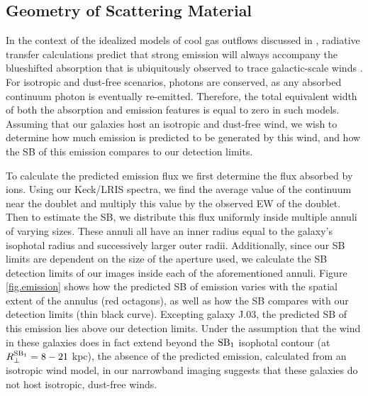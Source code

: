 \documentclass[twocolumn]{aastex62}
\begin{document}
\subsection{Geometry of Scattering Material}
In the context of the idealized models of cool gas outflows discussed in \cite{Prochaska_2011}, radiative transfer calculations predict that strong  emission will always accompany the blueshifted  absorption that is ubiquitously observed to trace galactic-scale winds \citep{Weiner2009,Martin2012,Rubin_2014}. For isotropic and dust-free scenarios, photons are conserved, as any absorbed continuum photon is eventually re-emitted.  Therefore, the total equivalent width of both the absorption and emission features is equal to zero in such models. Assuming that our galaxies host an isotropic and dust-free wind, we wish to determine how much emission is predicted to be generated by this wind, and how the SB of this emission compares to our detection limits.

To calculate the predicted emission flux we first determine the flux absorbed by  ions. Using our Keck/LRIS spectra, we find the average value of the continuum near the  doublet and multiply this value by the observed EW of the doublet. Then to estimate the SB, we distribute this flux uniformly inside multiple annuli of varying sizes. These annuli all have an inner radius equal to the galaxy's isophotal radius and successively larger outer radii.  Additionally, since our SB limits are dependent on the size of the aperture used, we calculate the SB detection limits of our images inside each of the aforementioned annuli. Figure \ref{fig.emission} shows how the predicted SB of emission varies with the spatial extent of the annulus (red octagons), as well as how the SB compares with our detection limits (thin black curve). Excepting galaxy J.03, the predicted SB of this emission lies above our detection limits. 
Under the assumption that the wind in these galaxies does in fact extend beyond the $\rm SB_1$ isophotal contour (at $R_{\perp}^{\rm{SB}_1} = 8-21$ kpc), the absence of the predicted emission, calculated from an isotropic wind model, in our narrowband imaging suggests that these galaxies do not host isotropic, dust-free winds.  
\end{document}

